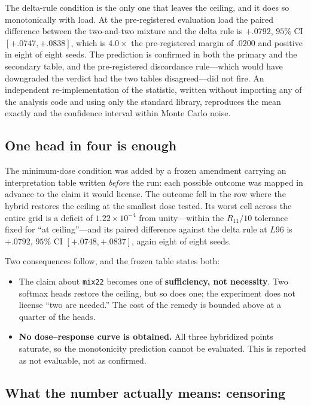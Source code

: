 \documentclass{article}
\begin{document}
The delta-rule condition is the only one that leaves the ceiling, and it does so
monotonically with load. At the pre-registered evaluation load the paired difference between
the two-and-two mixture and the delta rule is $+.0792$, $95\%$ CI $[+.0747, +.0838]$, which is
$4.0\times$ the pre-registered margin of $.0200$ and positive in eight of eight seeds. The
prediction is confirmed in both the primary and the secondary table, and the pre-registered
discordance rule---which would have downgraded the verdict had the two tables disagreed---did
not fire. An independent re-implementation of the statistic, written without importing any of
the analysis code and using only the standard library, reproduces the mean exactly and the
confidence interval within Monte Carlo noise.

\subsection{One head in four is enough}

The minimum-dose condition was added by a frozen amendment carrying an interpretation table
written \emph{before} the run: each possible outcome was mapped in advance to the claim it
would license. The outcome fell in the row where the hybrid restores the ceiling at the
smallest dose tested. Its worst cell across the entire grid is a deficit of
$1.22\times10^{-4}$ from unity---within the $R_{11}/10$ tolerance fixed for ``at ceiling''---and
its paired difference against the delta rule at $L96$ is $+.0792$,
$95\%$ CI $[+.0748, +.0837]$, again eight of eight seeds.

Two consequences follow, and the frozen table states both:

\begin{itemize}
  \item The claim about \texttt{mix22} becomes one of \textbf{sufficiency, not necessity}. Two
        softmax heads restore the ceiling, but so does one; the experiment does not license
        ``two are needed.'' The cost of the remedy is bounded above at a quarter of the heads.
  \item \textbf{No dose--response curve is obtained.} All three hybridized points saturate, so
        the monotonicity prediction cannot be evaluated. This is reported as not evaluable, not
        as confirmed.
\end{itemize}

\subsection{What the number actually means: censoring}
\end{document}
